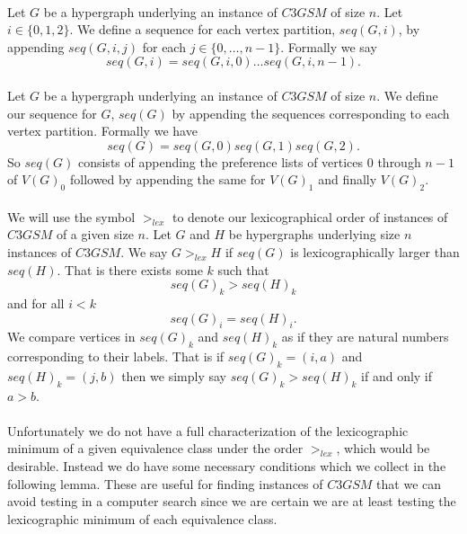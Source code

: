 \paragraph{}Let $G$ be a hypergraph underlying an instance of $C3GSM$ of size $n$. Let $i \in \{0,1,2\}$. We define a sequence for each vertex partition, $seq(G,i)$, by appending $seq(G,i,j)$ for each $j \in \{0, \dots, n-1\}$.  Formally we say
$$seq(G, i) = seq(G,i,0)\dots seq(G,i,n-1).$$

\paragraph{}Let $G$ be a hypergraph underlying an instance of $C3GSM$ of size $n$. We define our sequence for $G$, $seq(G)$ by appending the sequences corresponding to each vertex partition. Formally we have
$$seq(G) = seq(G,0)seq(G,1)seq(G,2).$$
So $seq(G)$ consists of appending the preference lists of vertices $0$ through $n-1$ of $V(G)_0$ followed by appending the same for $V(G)_1$ and finally $V(G)_2$.

\paragraph{}We will use the symbol $>_{lex}$ to denote our lexicographical order of instances of $C3GSM$ of a given size $n$. Let $G$ and $H$ be hypergraphs underlying size $n$ instances of $C3GSM$. We say $G >_{lex} H$ if $seq(G)$ is lexicographically larger than $seq(H)$. That is there exists some $k$ such that
$$seq(G)_k > seq(H)_k$$
and for all $i < k$
$$seq(G)_i = seq(H)_i.$$
We compare vertices in $seq(G)_k$ and $ seq(H)_k$ as if they are natural numbers corresponding to their labels. That is if $seq(G)_k = (i,a)$ and $seq(H)_k = (j,b)$ then we simply say $seq(G)_k > seq(H)_k$ if and only if $a>b$. 

\paragraph{}
Unfortunately we do not have a full characterization of the lexicographic minimum of a given equivalence class under the order $>_{lex}$, which would be desirable. Instead we do have some necessary conditions which we collect in the following lemma. These are useful for finding instances of $C3GSM$ that we can avoid testing in a computer search since we are certain we are at least testing the lexicographic minimum of each equivalence class.

